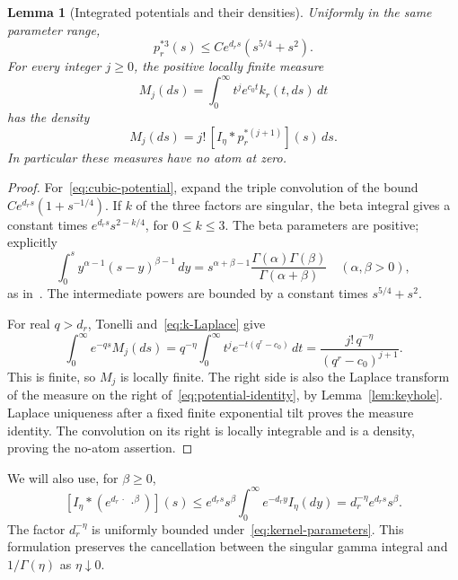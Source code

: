 \documentclass[11pt,a4paper]{article}
\numberwithin{equation}{section}
\newtheorem{lemma}[theorem]{Lemma}
\theoremstyle{definition}
\theoremstyle{remark}
\begin{document}
\begin{lemma}[Integrated potentials and their densities]\label{lem:potentials}
Uniformly in the same parameter range,
\begin{equation}\label{eq:cubic-potential}
 p_r^{*3}(s)\le C e^{d_rs}(s^{5/4}+s^2).
\end{equation}
For every integer $j\ge0$, the positive locally finite measure
\[
 M_j(ds)=\int_0^\infty t^je^{c_0t}k_r(t,ds)\,dt
\]
has the density
\begin{equation}\label{eq:potential-identity}
 M_j(ds)=j!\,[I_\eta*p_r^{*(j+1)}](s)\,ds.
\end{equation}
In particular these measures have no atom at zero.
\end{lemma}
\begin{proof}
For~\eqref{eq:cubic-potential}, expand the triple convolution of the bound
$C e^{d_rs}(1+s^{-1/4})$. If $k$ of the three factors are singular, the beta integral gives a constant times $e^{d_rs}s^{2-k/4}$, for $0\le k\le3$. The beta parameters are positive; explicitly
\[
 \int_0^s y^{\alpha-1}(s-y)^{\beta-1}\,dy
 =s^{\alpha+\beta-1}
       \frac{\Gamma(\alpha)\Gamma(\beta)}{\Gamma(\alpha+\beta)}
 \quad(\alpha,\beta>0),
\]
as in~\cite[Eq.~5.12.1]{DLMFbeta}. The intermediate powers are bounded by a constant times $s^{5/4}+s^2$.

For real $q>d_r$, Tonelli and~\eqref{eq:k-Laplace} give
\[
 \int_0^\infty e^{-qs}M_j(ds)
 =q^{-\eta}\int_0^\infty t^je^{-t(q^r-c_0)}\,dt
 =\frac{j!\,q^{-\eta}}{(q^r-c_0)^{j+1}}.
\]
This is finite, so $M_j$ is locally finite. The right side is also the Laplace transform of the measure on the right of~\eqref{eq:potential-identity}, by Lemma~\ref{lem:keyhole}. Laplace uniqueness after a fixed finite exponential tilt proves the measure identity. The convolution on its right is locally integrable and is a density, proving the no-atom assertion.
\end{proof}

We will also use, for $\beta\ge0$,
\begin{equation}\label{eq:gamma-convolution-bound}
 [I_\eta*(e^{d_r\,\cdot}\,\cdot^\beta)](s)
 \le e^{d_rs}s^\beta\int_0^\infty e^{-d_ry}I_\eta(dy)
 =d_r^{-\eta}e^{d_rs}s^\beta.
\end{equation}
The factor $d_r^{-\eta}$ is uniformly bounded under~\eqref{eq:kernel-parameters}. This formulation preserves the cancellation between the singular gamma integral and $1/\Gamma(\eta)$ as $\eta\downarrow0$.
\end{document}
